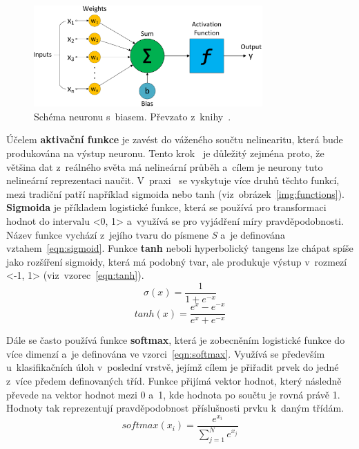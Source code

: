 \begin{figure}[hbt]
	\centering
	\setlength{\fboxsep}{0pt}
	\includegraphics[width=0.78\textwidth]{obrazky-figures/neuron.pdf}
	\caption{Schéma neuronu s~biasem. Převzato z~knihy~\cite{book:NNandDL}.}
	\label{img:Neuron}
\end{figure}

Účelem \textbf{aktivační funkce} je zavést do váženého součtu nelinearitu, která bude produkována na výstup neuronu. Tento krok~\cite{website:IntroToNN} je důležitý zejména proto, že většina dat z~reálného světa má nelineární průběh a~cílem je neurony tuto nelineární reprezentaci naučit. V~praxi~\cite{website:OverviewOfActivationFunctions} se vyskytuje více druhů těchto funkcí, mezi tradiční patří například sigmoida nebo tanh (viz~obrázek~\ref{img:functions}). \textbf{Sigmoida} je příkladem logistické funkce, která se používá pro transformaci hodnot do intervalu <0, 1> a~využívá se pro vyjádření míry pravděpodobnosti. Název funkce vychází z~jejího tvaru do písmene \emph{S} a~je definována vztahem~\ref{eqn:sigmoid}. Funkce \textbf{tanh} neboli hyperbolický tangens lze chápat spíše jako rozšíření sigmoidy, která má podobný tvar, ale produkuje výstup v~rozmezí <-1, 1> (viz~vzorec~\ref{eqn:tanh}).
\begin{equation}
    \label{eqn:sigmoid}
    \sigma(x) = \frac{1}{1 + e^{-x}}
\end{equation}
\begin{equation}
    \label{eqn:tanh}
    tanh(x) = \frac{e^x - e^{-x}}{e^x + e^{-x}}
\end{equation}

Dále se často používá funkce \textbf{softmax}, která je zobecněním logistické funkce do více dimenzí a~je definována ve vzorci~\ref{eqn:softmax}. Využívá se především u~klasifikačních úloh v~poslední vrstvě, jejímž cílem je přiřadit prvek do jedné z~více předem definovaných tříd. Funkce přijímá vektor hodnot, který následně převede na vektor hodnot mezi 0 a~1, kde hodnota po součtu je rovná právě 1. Hodnoty tak reprezentují pravděpodobnost příslušnosti prvku k~daným třídám.
\begin{equation}
    \label{eqn:softmax}
    softmax(x_i) = \frac{e^{x_i}}{\sum_{j=1}^{N}e^{x_j}}
\end{equation}
    
